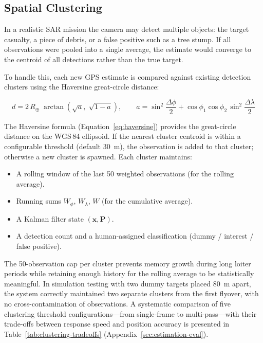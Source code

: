 \subsection{Spatial Clustering}\label{sec:clustering}

In a realistic SAR mission the camera may detect multiple objects: the target casualty, a piece of debris, or a false positive such as a tree stump.  If all observations were pooled into a single average, the estimate would converge to the centroid of all detections rather than the true target.

To handle this, each new GPS estimate is compared against existing detection clusters using the Haversine great-circle distance:

\begin{equation}\label{eq:haversine}
  d = 2\,R_\oplus\;\arctan\!\left(
    \sqrt{a},\;\sqrt{1-a}
  \right),
  \qquad
  a = \sin^2\!\frac{\Delta\phi}{2} + \cos\phi_1\cos\phi_2\,\sin^2\!\frac{\Delta\lambda}{2}
\end{equation}

\noindent The Haversine formula (Equation~\ref{eq:haversine}) provides the great-circle distance on the WGS\,84 ellipsoid.  If the nearest cluster centroid is within a configurable threshold (default \SI{30}{\metre}), the observation is added to that cluster; otherwise a new cluster is spawned.  Each cluster maintains:

\begin{itemize}
  \item A rolling window of the last 50 weighted observations (for the rolling average).
  \item Running sums $W_\phi$, $W_\lambda$, $W$ (for the cumulative average).
  \item A Kalman filter state $(\mathbf{x}, \mathbf{P})$.
  \item A detection count and a human-assigned classification (dummy / interest / false positive).
\end{itemize}

\noindent The 50-observation cap per cluster prevents memory growth during long loiter periods while retaining enough history for the rolling average to be statistically meaningful.  In simulation testing with two dummy targets placed \SI{80}{\metre} apart, the system correctly maintained two separate clusters from the first flyover, with no cross-contamination of observations.  A systematic comparison of five clustering threshold configurations---from single-frame to multi-pass---with their trade-offs between response speed and position accuracy is presented in Table~\ref{tab:clustering-tradeoffs} (Appendix~\ref{sec:estimation-eval}).

